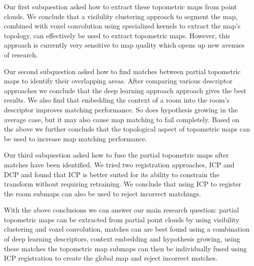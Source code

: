 Our first subquestion asked how to extract these topometric maps from point clouds. We conclude that a visibility clustering approach to segment the map, combined with voxel convolution using specialized kernels to extract the map's topology, can effectively be used to extract topometric maps. However, this approach is currently very sensitive to map quality which opens up new avenues of research.

Our second subquestion asked how to find matches between partial topometric maps to identify their overlapping areas. After comparing various descriptor approaches we conclude that the deep learning approach approach gives the best results. We also find that embedding the context of a room into the room's descriptor improves matching performance. So does hypothesis growing in the average case, but it may also cause map matching to fail completely. Based on the above we further conclude that the topological aspect of topometric maps can be used to increase map matching performance.  

Our third subquestion asked how to fuse the partial topometric maps after matches have been identified. We tried two registration approaches, ICP and DCP and found that ICP is better suited for its ability to constrain the transform without requiring retraining. We conclude that using ICP to register the room submaps can also be used to reject incorrect matchings. 

With the above conclusions we can answer our main research question: partial topometric maps can be extracted from partial point clouds by using visibility clustering and voxel convolution, matches can are best found using a combination of deep learning descriptors, context embedding and hypothesis growing, using these matches the topometric map submaps can then be individually fused using ICP registration to create the global map and reject incorrect matches.